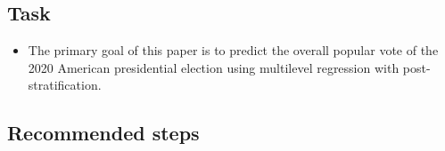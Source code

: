 \documentclass[
]{book}
\providecommand{\tightlist}{%
  \setlength{\itemsep}{0pt}\setlength{\parskip}{0pt}}
\begin{document}
\hypertarget{task-6}{%
\subsection{Task}\label{task-6}}

\begin{itemize}
\tightlist
\item
  The primary goal of this paper is to predict the overall popular vote of the 2020 American presidential election using multilevel regression with post-stratification.
\end{itemize}

\hypertarget{recommended-steps-2}{%
\subsection{Recommended steps}\label{recommended-steps-2}}
\end{document}
